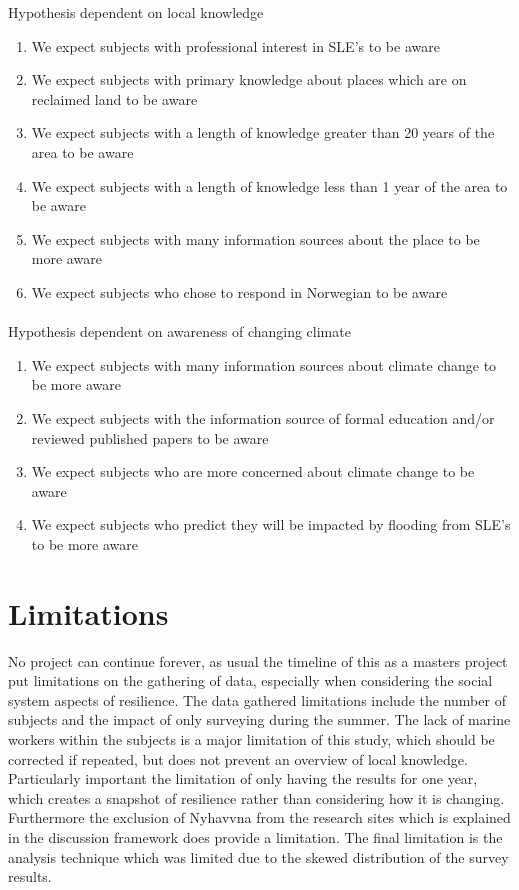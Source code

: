 Hypothesis dependent on local knowledge
\begin{enumerate}
    \item We expect subjects with professional interest in SLE's to be aware
    \item We expect subjects with primary knowledge about places which are on reclaimed land to be aware
    \item We expect subjects with a length of knowledge greater than 20 years of the area to be aware
    \item We expect subjects with a length of knowledge less than 1 year of the area to be aware
    \item We expect subjects with many information sources about the place to be more aware
    \item We expect subjects who chose to respond in Norwegian to be aware
\end{enumerate}
\paragraph{}

Hypothesis dependent on awareness of changing climate
\begin{enumerate}
    \item We expect subjects with many information sources about climate change to be more aware
    \item We expect subjects with the information source of formal education and/or reviewed published papers to be aware
    \item We expect subjects who are more concerned about climate change to be aware
    \item We expect subjects who predict they will be impacted by flooding from SLE's to be more aware
\end{enumerate}

\section{Limitations}
No project can continue forever, as usual the timeline of this as a masters project put limitations on the gathering of data, especially when considering the social system aspects of resilience. The data gathered limitations include the number of subjects and the impact of only surveying during the summer. The lack of marine workers within the subjects is a major limitation of this study, which should be corrected if repeated, but does not prevent an overview of local knowledge. Particularly important the limitation of only having the results for one year, which creates a snapshot of resilience rather than considering how it is changing. Furthermore the exclusion of Nyhavvna from the research sites which is explained in the discussion framework does provide a limitation.  The final limitation is the analysis technique which was limited due to the skewed distribution of the survey results.

